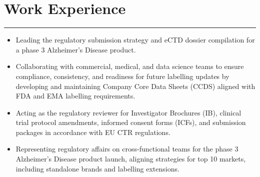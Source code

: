 \documentclass[a4paper]{deedy-resume} %
\begin{document}



\vspace{-10pt}
\section{Work Experience}


\begin{center}
    \vspace{-17pt}
    \rule{0.98\linewidth}{0.5pt}
    \vspace{-11pt}
\end{center}
\begin{itemize} 
    \item Leading the regulatory submission strategy and eCTD dossier compilation for a phase 3 Alzheimer's Disease product. 
    \item Collaborating with commercial, medical, and data science teams to ensure compliance, consistency, and readiness for future labelling updates by developing and maintaining Company Core Data Sheets (CCDS) aligned with FDA and EMA labelling requirements.
    \item Acting as the regulatory reviewer for Investigator Brochures (IB), clinical trial protocol amendments, informed consent forms (ICFs), and submission packages in accordance with EU CTR regulations.
    \item Representing regulatory affairs on cross-functional teams for the phase 3 Alzheimer's Disease product launch, aligning strategies for top 10 markets, including standalone brands and labelling extensions.
\end{itemize}
\end{document}
